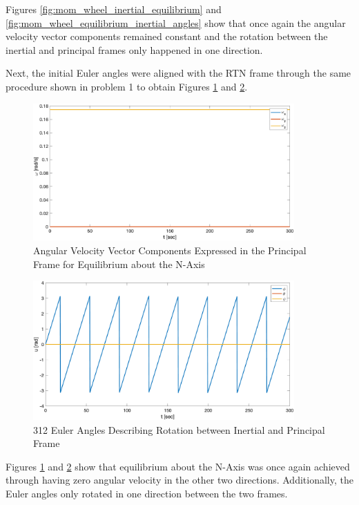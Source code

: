Figures \ref{fig:mom_wheel_inertial_equilibrium} and \ref{fig:mom_wheel_equilibrium_inertial_angles} show that once again the angular velocity vector components remained constant and the rotation between the inertial and principal frames only happened in one direction.

Next, the initial Euler angles were aligned with the RTN frame through the same procedure shown in problem 1 to obtain Figures \ref{fig:mom_wheel_RTN_equilibrium} and \ref{fig:mom_wheel_equilibrium_RTN_angles}.

\begin{figure}[H]
    \centering
    \captionsetup{justification = centering}
    \includegraphics[width = 10cm]{Images/PS4/mom_wheel_equilibrium_RTN_velocities.png}
    \caption{Angular Velocity Vector Components Expressed in the Principal Frame for Equilibrium about the N-Axis}
    \label{fig:mom_wheel_RTN_equilibrium}
\end{figure}

\begin{figure}[H]
    \centering
    \captionsetup{justification = centering}
    \includegraphics[width = 10cm]{Images/PS4/mom_wheel_equilibrium_RTN_angles.png}
    \caption{312 Euler Angles Describing Rotation between Inertial and Principal Frame}
    \label{fig:mom_wheel_equilibrium_RTN_angles}
\end{figure}

Figures \ref{fig:mom_wheel_RTN_equilibrium} and \ref{fig:mom_wheel_equilibrium_RTN_angles} show that equilibrium about the N-Axis was once again achieved through having zero angular velocity in the other two directions. Additionally, the Euler angles only rotated in one direction between the two frames.

